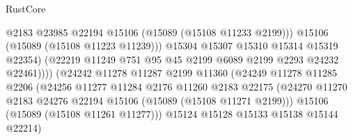 \begin{lexlean}{RustCore}
\begin{coremodule}
                                            @2183
                                            @23985
                                            @22194
                                            @15106
                                            (@15089 (@15108 @11233 @2199)))
                                          @15106
                                          (@15089 (@15108 @11223 @11239)))
                                        @15304
                                        @15307
                                        @15310
                                        @15314
                                        @15319
                                        @22354)
                                      (@22219
                                        @11249
                                        @751
                                        @95
                                        @45
                                        @2199
                                        @6089
                                        @2199
                                        @2293
                                        @24232
                                        @22461))))
                                (@24242
                                  @11278
                                  @11287
                                  @2199
                                  @11360
                                  (@24249
                                    @11278
                                    @11285
                                    @2206
                                    (@24256
                                      @11277
                                      @11284
                                      @2176
                                      @11260
                                      @2183
                                      @22175
                                      (@24270
                                        @11270
                                        @2183
                                        @24276
                                        @22194
                                        @15106
                                        (@15089 (@15108 @11271 @2199)))
                                      @15106
                                      (@15089 (@15108 @11261 @11277)))
                                    @15124
                                    @15128
                                    @15133
                                    @15138
                                    @15144
                                    @22214)

\end{coremodule}
\end{lexlean}
